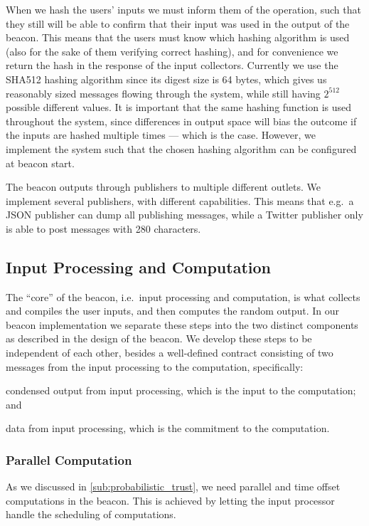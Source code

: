When we hash the users' inputs we must inform them of the operation, such that they still will be able to confirm that their input was used in the output of the beacon.
This means that the users must know which hashing algorithm is used (also for the sake of them verifying correct hashing), and for convenience we return the hash in the response of the input collectors.
Currently we use the SHA512 hashing algorithm since its digest size is 64 bytes, which gives us reasonably sized messages flowing through the system, while still having $2^{512}$ possible different values.
It is important that the same hashing function is used throughout the system, since differences in output space will bias the outcome if the inputs are hashed multiple times --- which is the case.
However, we implement the system such that the chosen hashing algorithm can be configured at beacon start.

The beacon outputs through publishers to multiple different outlets.
We implement several publishers, with different capabilities.
This means that e.g.\ a JSON publisher can dump all publishing messages, while a Twitter publisher only is able to post messages with 280 characters.

\subsection{Input Processing and Computation}%
\label{sub:input_processing_and_computation}
The \enquote{core} of the beacon, i.e.\ input processing and computation, is what collects and compiles the user inputs, and then computes the random output.
In our beacon implementation we separate these steps into the two distinct components as described in the design of the beacon.
We develop these steps to be independent of each other, besides a well-defined contract consisting of two messages from the input processing to the computation, specifically:
\begin{eletterate*}
\item condensed output from input processing, which is the input to the computation; and
\item data from input processing, which is the commitment to the computation.
\end{eletterate*}

\subsubsection{Parallel Computation}%
\label{ssub:parallel_computation}
As we discussed in \cref{sub:probabilistic_trust}, we need parallel and time offset computations in the beacon.
This is achieved by letting the input processor handle the scheduling of computations.

